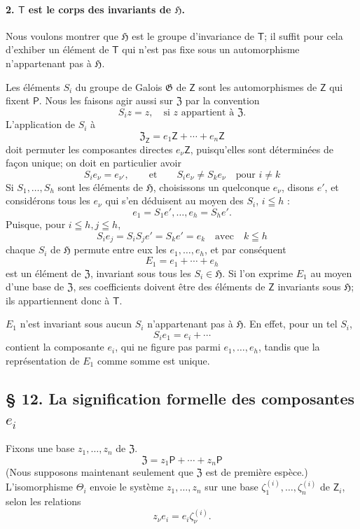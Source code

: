 \paragraph{2. \(\mathsf T\) est le corps des invariants de \(\mathfrak H\).}
Nous voulons montrer que \(\mathfrak H\) est le groupe d'invariance de \(\mathsf T\); il suffit pour cela d'exhiber un élément de \(\mathsf T\) qui n'est pas fixe sous un automorphisme n'appartenant pas à \(\mathfrak H\).

Les éléments \(S_i\) du groupe de Galois \(\mathfrak G\) de \(\mathsf Z\) sont les automorphismes de \(\mathsf Z\) qui fixent \(\mathsf P\). Nous les faisons agir aussi sur \(\mathfrak Z\) par la convention
\[
S_i z=z,\quad \text{si } z \text{ appartient à } \mathfrak Z.
\]
L'application de \(S_i\) à
\[
\mathfrak Z_{\mathsf Z}=e_1\mathsf Z+\cdots+e_n\mathsf Z
\]
doit permuter les composantes directes \(e_\nu\mathsf Z\), puisqu'elles sont déterminées de façon unique; on doit en particulier avoir
\[
S_i e_\nu=e_{\nu'},\qquad\text{et}\qquad S_i e_\nu\ne S_k e_\nu
\quad\text{pour } i\ne k
\]
Si \(S_1,\ldots,S_h\) sont les éléments de \(\mathfrak H\), choisissons un quelconque \(e_\nu\), disons \(e'\), et considérons tous les \(e_\nu\) qui s'en déduisent au moyen des \(S_i\), \(i\leqq h\) :
\[
e_1=S_1e',\ldots,e_h=S_he'.
\]
Puisque, pour \(i\leqq h, j\leqq h\),
\[
S_i e_j=S_iS_j e'=S_ke'=e_k \quad \text{avec}\quad k\leqq h
\]
chaque \(S_i\) de \(\mathfrak H\) permute entre eux les \(e_1,\ldots,e_h\), et par conséquent
\[
E_1=e_1+\cdots+e_h
\]
est un élément de \(\mathfrak Z\), invariant sous tous les \(S_i\in\mathfrak H\). Si l'on exprime \(E_1\) au moyen d'une base de \(\mathfrak Z\), ses coefficients doivent être des éléments de \(\mathsf Z\) invariants sous \(\mathfrak H\); ils appartiennent donc à \(\mathsf T\).

\(E_1\) n'est invariant sous aucun \(S_i\) n'appartenant pas à \(\mathfrak H\). En effet, pour un tel \(S_i\),
\[
S_i e_1=e_i+\cdots
\]
contient la composante \(e_i\), qui ne figure pas parmi \(e_1,\ldots,e_h\), tandis que la représentation de \(E_1\) comme somme est unique.

\subsection*{\S{} 12. La signification formelle des composantes \(e_i\)}\label{die-formale-bedeutung-der-komponenten-ei}

Fixons une base \(z_1,\ldots,z_n\) de \(\mathfrak Z\).
\[
\mathfrak Z=z_1\mathsf P+\cdots+z_n\mathsf P
\]
(Nous supposons maintenant seulement que \(\mathfrak Z\) est de première espèce.) L'isomorphisme \(\Theta_i\) envoie le système \(z_1,\ldots,z_n\) sur une base \(\zeta_1^{(i)},\ldots,\zeta_n^{(i)}\) de \(\mathsf Z_i\), selon les relations
\[
z_\nu e_i=e_i\zeta_\nu^{(i)} .
\]

